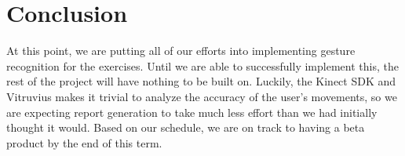 \documentclass[onecolumn, draftclsnofoot,10pt, compsoc]{IEEEtran}
\begin{document}
\section{Conclusion}
At this point, we are putting all of our efforts into implementing gesture recognition for the exercises. Until we are able to successfully implement this, the rest of the project will have nothing to be built on. Luckily, the Kinect SDK and Vitruvius makes it trivial to analyze the accuracy of the user's movements, so we are expecting report generation to take much less effort than we had initially thought it would. Based on our schedule, we are on track to having a beta product by the end of this term.
\end{document}
